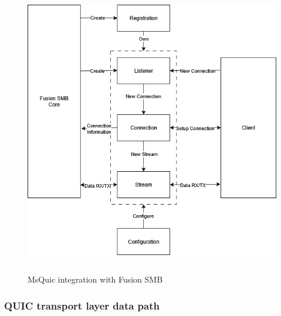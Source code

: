 \documentclass[english, 12pt, a4paper, elec, utf8, a-2b, online]{aaltothesis}
\begin{document}
\begin{figure}[h]
	\centering
	\includegraphics[alt={Block diagram of the flow between Fusion SMB and MsQuic}, height=12cm]{./images/MsQuic_integration.png}
	\caption{MsQuic integration with Fusion SMB}
	\label{fig:msquic_int}
\end{figure}

\subsubsection{QUIC transport layer data path}
\end{document}
